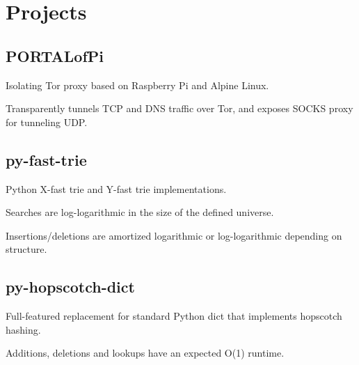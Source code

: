 \documentclass[]{deedy-resume-openfont}
\begin{document}
\begin{minipage}[t]{0.64\textwidth}

\section{Projects}
\subsection{PORTALofPi}
\vspace{\topsep} %
\begin{tightemize}
\item Isolating Tor proxy based on Raspberry Pi and Alpine Linux.
\item Transparently tunnels TCP and DNS traffic over Tor, and exposes SOCKS proxy for tunneling UDP.
\end{tightemize}
\sectionsep

\subsection{py-fast-trie}
\vspace{\topsep} %
\begin{tightemize}
\item Python X-fast trie and Y-fast trie implementations.
\item Searches are log-logarithmic in the size of the defined universe.
\item Insertions/deletions are amortized logarithmic or log-logarithmic depending on structure.
\end{tightemize}
\sectionsep

\subsection{py-hopscotch-dict}
\vspace{\topsep} %
\begin{tightemize}
\item Full-featured replacement for standard Python dict that implements hopscotch hashing.
\item Additions, deletions and lookups have an expected O(1) runtime.
\end{tightemize}
\sectionsep

%

\end{minipage}
\end{document}
